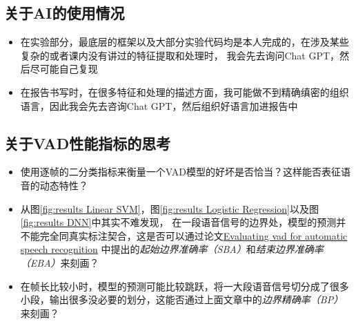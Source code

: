 \documentclass[a4paper]{article}
\begin{document}
\subsection{关于AI的使用情况}
\begin{itemize}
  \item 在实验部分，最底层的框架以及大部分实验代码均是本人完成的，在涉及某些复杂的或者课内没有讲过的特征提取和处理时，
  我会先去询问Chat GPT，然后尽可能自己复现
  \item 在报告书写时，在很多特征和处理的描述方面，我可能做不到精确缜密的组织语言，因此我会先去咨询Chat GPT，然后组织好语言加进报告中
\end{itemize}

\subsection{关于VAD性能指标的思考}
\begin{itemize}
  \item 使用逐帧的二分类指标来衡量一个VAD模型的好坏是否恰当？这样能否表征语音的动态特性？
  \item 从图\ref{fig:results Linear SVM}，图\ref{fig:results Logistic Regression}以及图\ref{fig:results DNN}中其实不难发现，
  在一段语音信号的边界处，模型的预测并不能完全同真实标注契合，这是否可以通过论文\href{https://ieeexplore.ieee.org/document/7015406}{Evaluating vad for automatic speech recognition}
  中提出的\emph{起始边界准确率（SBA）}和\emph{结束边界准确率（EBA）}来刻画？
  \item 在帧长比较小时，模型的预测可能比较跳跃，将一大段语音信号切分成了很多小段，输出很多没必要的划分，这能否通过上面文章中的\emph{边界精确率（BP）}来刻画？
\end{itemize}
\end{document}
